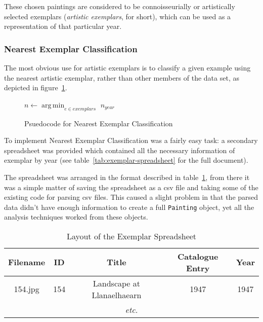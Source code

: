 These chosen paintings are considered to be connoisseurially or artistically selected exemplars
(\emph{artistic exemplars}, for short), which can be used as a representation of that particular
year.


\subsubsection{Nearest Exemplar Classification}
The most obvious use for artistic exemplars is to classify a given example using the nearest 
artistic exemplar, rather than other members of the data set, as depicted in 
figure~\ref{fig:nearest-exemplar}.

\begin{figure}[h]
\begin{algorithmic}
\State $n \gets \operatorname*{arg\,min}_{e \in exemplars}$ 
\State \Return $n_{year}$
\EndFunction
\end{algorithmic}
\caption{Psuedocode for Nearest Exemplar Classification}\label{fig:nearest-exemplar}
\end{figure}

To implement Nearest Exemplar Classification was a fairly easy task: a secondary spreadsheet was 
provided which contained all the necessary information of exemplar by year (see 
table~\ref{tab:exemplar-spreadsheet} for the full document).

The spreadsheet was arranged in the format described in table~\ref{tab:exemplar-layout}, from
there it was a simple matter of saving the spreadsheet as a \gls{csv} file and taking some of the
existing code for parsing \gls{csv} files. This caused a slight problem in that the parsed data
didn't have enough information to create a full \texttt{Painting} object, yet all the analysis
techniques worked from these objects.

\begin{table}[h]
\centering
\begin{tabular}{|c|c|c|c|c|} \hline
Filename & ID  & Title                      & Catalogue Entry & Year \\\hline
154.jpg  & 154 & Landscape at Llanaelhaearn & 1947            & 1947 \\\hline
\multicolumn{5}{|c|}{\textit{etc.}}\\\hline
\end{tabular}
\caption{Layout of the Exemplar Spreadsheet}\label{tab:exemplar-layout}
\end{table}

